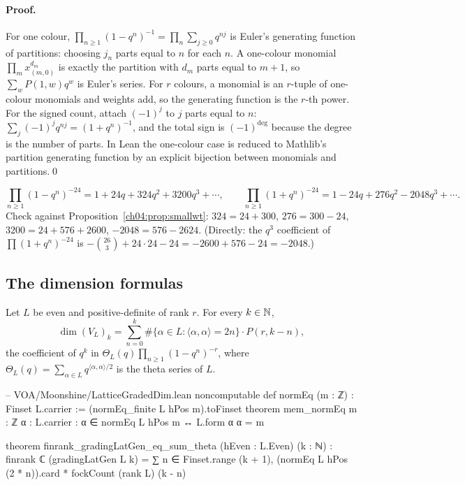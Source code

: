 \paragraph{Proof.} For one colour, $\prod_{n\ge1}(1-q^n)^{-1}=\prod_n\sum_{j\ge0}q^{nj}$ is Euler's
generating function of partitions: choosing $j_n$ parts equal to $n$ for each $n$. A one-colour
monomial $\prod_m x_{(m,0)}^{d_m}$ is exactly the partition with $d_m$ parts equal to $m+1$, so
$\sum_wP(1,w)q^w$ is Euler's series. For $r$ colours, a monomial is an $r$-tuple of one-colour
monomials and weights add, so the generating function is the $r$-th power. For the signed count,
attach $(-1)^{j}$ to $j$ parts equal to $n$: $\sum_j(-1)^jq^{nj}=(1+q^n)^{-1}$, and the total sign is
$(-1)^{\deg}$ because the degree is the number of parts. In Lean the one-colour case is reduced to
Mathlib's partition generating function by an explicit bijection between monomials and
partitions.\qed

\begin{example}[Low coefficients for $r=24$]\label{ch04:ex:fock24}
\begin{equation*}
  \prod_{n\ge1}(1-q^n)^{-24}=1+24q+324q^2+3200q^3+\cdots,\qquad
  \prod_{n\ge1}(1+q^n)^{-24}=1-24q+276q^2-2048q^3+\cdots.
\end{equation*}
Check against Proposition~\ref{ch04:prop:smallwt}: $324=24+300$, $276=300-24$, $3200=24+576+2600$,
$-2048=576-2624$. (Directly: the $q^3$ coefficient of $\prod(1+q^n)^{-24}$ is
$-\binom{26}3+24\cdot24-24=-2600+576-24=-2048$.)
\end{example}

\subsection{The dimension formulas}

\begin{theorem}\label{ch04:thm:dimVL}
Let $L$ be even and positive-definite of rank $r$. For every $k\in{\mathbb{N}}$,
\begin{equation*}
  \dim(V_L)_k=\sum_{n=0}^{k}\#\{\alpha\in L:\langle\alpha,\alpha\rangle=2n\}\cdot P(r,k-n),
\end{equation*}
the coefficient of $q^k$ in $\Theta_L(q)\prod_{n\ge1}(1-q^n)^{-r}$, where
$\Theta_L(q)=\sum_{\alpha\in L}q^{\langle\alpha,\alpha\rangle/2}$ is the theta series of $L$.
\end{theorem}

\begin{leancode}
-- VOA/Moonshine/LatticeGradedDim.lean
noncomputable def normEq (m : ℤ) : Finset L.carrier := (normEq_finite L hPos m).toFinset
theorem mem_normEq {m : ℤ} {α : L.carrier} : α ∈ normEq L hPos m ↔ L.form α α = m

theorem finrank_gradingLatGen_eq_sum_theta (hEven : L.Even) (k : ℕ) :
    finrank ℂ (gradingLatGen L k)
      = ∑ n ∈ Finset.range (k + 1), (normEq L hPos (2 * n)).card * fockCount (rank L) (k - n)
\end{leancode}

